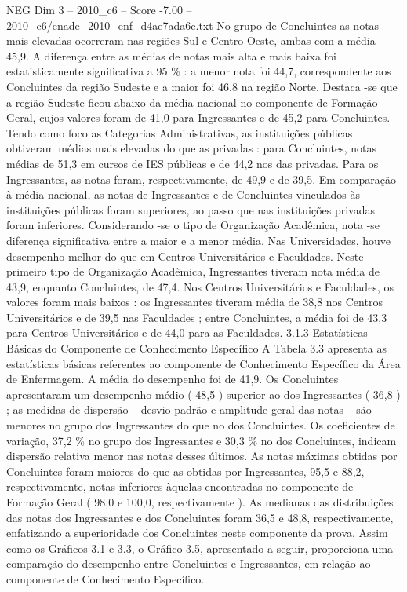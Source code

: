 \begin{textsample}{NEG Dim 3 – 2010\_c6 – Score -7.00 – 2010\_c6/enade\_2010\_enf\_d4ae7ada6c.txt}
No grupo de Concluintes as notas mais elevadas ocorreram nas regiões Sul e Centro-Oeste, ambas com a média 45,9.
A diferença entre as médias de notas mais alta e mais baixa foi estatisticamente significativa a 95 \% : a menor nota foi 44,7, correspondente aos Concluintes da região Sudeste e a maior foi 46,8 na região Norte.
Destaca -se que a região Sudeste ficou abaixo da média nacional no componente de Formação Geral, cujos valores foram de 41,0 para Ingressantes e de 45,2 para Concluintes.
Tendo como foco as Categorias Administrativas, as instituições públicas obtiveram médias mais elevadas do que as privadas : para Concluintes, notas médias de 51,3 em cursos de IES públicas e de 44,2 nos das privadas.
Para os Ingressantes, as notas foram, respectivamente, de 49,9 e de 39,5.
Em comparação à média nacional, as notas de Ingressantes e de Concluintes vinculados às instituições públicas foram superiores, ao passo que nas instituições privadas foram inferiores.
Considerando -se o tipo de Organização Acadêmica, nota -se diferença significativa entre a maior e a menor média.
Nas Universidades, houve desempenho melhor do que em Centros Universitários e Faculdades.
Neste primeiro tipo de Organização Acadêmica, Ingressantes tiveram nota média de 43,9, enquanto Concluintes, de 47,4.
Nos Centros Universitários e Faculdades, os valores foram mais baixos : os Ingressantes tiveram média de 38,8 nos Centros Universitários e de 39,5 nas Faculdades ; entre Concluintes, a média foi de 43,3 para Centros Universitários e de 44,0 para as Faculdades. 3.1.3 Estatísticas Básicas do Componente de Conhecimento Específico A Tabela 3.3 apresenta as estatísticas básicas referentes ao componente de Conhecimento Específico da Área de Enfermagem.
A média do desempenho foi de 41,9.
Os Concluintes apresentaram um desempenho médio ( 48,5 ) superior ao dos Ingressantes ( 36,8 ) ; as medidas de dispersão – desvio padrão e amplitude geral das notas – são menores no grupo dos Ingressantes do que no dos Concluintes.
Os coeficientes de variação, 37,2 \% no grupo dos Ingressantes e 30,3 \% no dos Concluintes, indicam dispersão relativa menor nas notas desses últimos.
As notas máximas obtidas por Concluintes foram maiores do que as obtidas por Ingressantes, 95,5 e 88,2, respectivamente, notas inferiores àquelas encontradas no componente de Formação Geral ( 98,0 e 100,0, respectivamente ).
As medianas das distribuições das notas dos Ingressantes e dos Concluintes foram 36,5 e 48,8, respectivamente, enfatizando a superioridade dos Concluintes neste componente da prova.
Assim como os Gráficos 3.1 e 3.3, o Gráfico 3.5, apresentado a seguir, proporciona uma comparação do desempenho entre Concluintes e Ingressantes, em relação ao componente de Conhecimento Específico.

\end{textsample}
